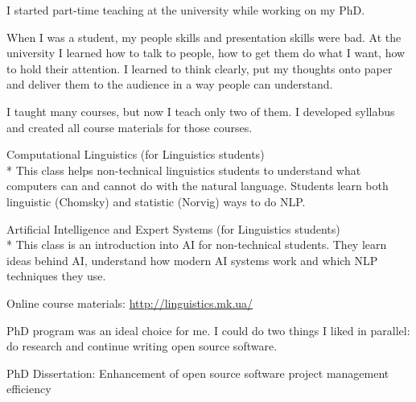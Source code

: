 \documentclass[12pt]{letter}
\begin{document}
\begin{llist}
            \item I started part-time teaching at the university while working on my PhD.

            \item When I was a student, my people skills and presentation skills were bad. At the university I learned how to talk to people, how to get them do what I want, how to hold their attention. I learned to think clearly, put my thoughts onto paper and deliver them to the audience in a way people can understand.

            \item I taught many courses, but now I teach only two of them. I developed syllabus and created all course materials for those courses.

            \item Computational Linguistics (for Linguistics students)\\*
            This class helps non-technical linguistics students to understand what computers can and cannot do with the natural language. Students learn both linguistic (Chomsky) and statistic (Norvig) ways to do NLP.

            \item Artificial Intelligence and Expert Systems (for Linguistics students)\\*
            This class is an introduction into AI for non-technical students. They learn ideas behind AI, understand how modern AI systems work and which NLP techniques they use.

            \item Online course materials: \url{http://linguistics.mk.ua/}

  \endexperience




  \startexperience

            \item PhD program was an ideal choice for me. I could do two things I liked in parallel: do research and continue writing open source software.

            \item PhD Dissertation: Enhancement of open source software project management efficiency


\end{llist}
\end{document}
